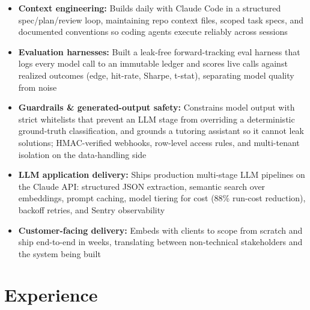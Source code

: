 \documentclass[10.5pt, letterpaper]{article}
\begin{document}
\begin{itemize}
  \item \textbf{Context engineering:} Builds daily with Claude Code in a structured
        spec/plan/review loop, maintaining repo context files, scoped task specs,
        and documented conventions so coding agents execute reliably across sessions
  \item \textbf{Evaluation harnesses:} Built a leak-free forward-tracking eval harness
        that logs every model call to an immutable ledger and scores live calls
        against realized outcomes (edge, hit-rate, Sharpe, t-stat), separating model
        quality from noise
  \item \textbf{Guardrails \& generated-output safety:} Constrains model output with
        strict whitelists that prevent an LLM stage from overriding a deterministic
        ground-truth classification, and grounds a tutoring assistant so it cannot
        leak solutions; HMAC-verified webhooks, row-level access rules, and
        multi-tenant isolation on the data-handling side
  \item \textbf{LLM application delivery:} Ships production multi-stage LLM pipelines
        on the Claude API: structured JSON extraction, semantic search over
        embeddings, prompt caching, model tiering for cost (88\% run-cost reduction),
        backoff retries, and Sentry observability
  \item \textbf{Customer-facing delivery:} Embeds with clients to scope from scratch
        and ship end-to-end in weeks, translating between non-technical stakeholders
        and the system being built
\end{itemize}

\section{Experience}
\end{document}

